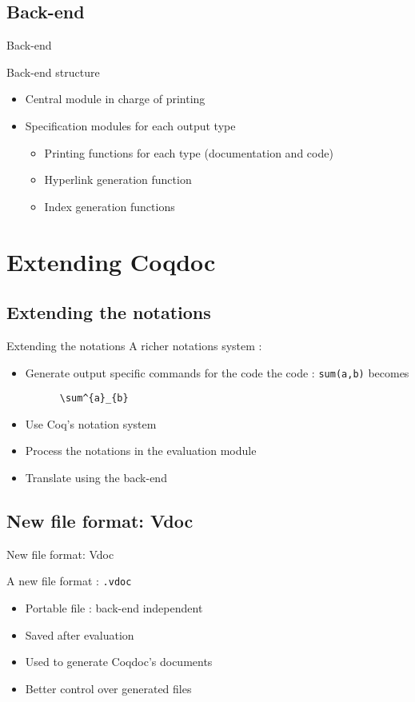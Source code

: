 \documentclass[compress]{beamer}
\newenvironment{tframe}[1]{
  \subsection{#1}
  \begin{frame}{#1}
  }{
  \end{frame}
  }
\begin{document}
  \begin{tframe}{Back-end}
    Back-end structure
    \begin{itemize}
      \item Central module in charge of printing
      \item Specification modules for each output type
        \begin{itemize}
          \item Printing functions for each type (documentation and code)
          \item Hyperlink generation function
          \item Index generation functions
        \end{itemize}
    \end{itemize}
  \end{tframe}

\section{Extending Coqdoc}
\subsection{Extending the notations}
\begin{frame}[containsverbatim]{Extending the notations}
  A richer notations system :
  \begin{itemize}
    \item Generate output specific commands for the code
      the code : \texttt{sum(a,b)} becomes
      \begin{verbatim}
      \sum^{a}_{b}
      \end{verbatim}
    \item Use Coq's notation system
    \item Process the notations in the evaluation module
    \item Translate using the back-end
  \end{itemize}
\end{frame}
\begin{tframe}{New file format: Vdoc}
  A new file format : \texttt{.vdoc}
  \begin{itemize}
    \item Portable file : back-end independent
    \item Saved after evaluation
    \item Used to generate Coqdoc's documents
    \item Better control over generated files
  \end{itemize}
\end{tframe}
\end{document}
